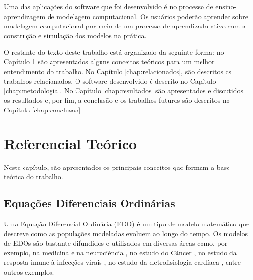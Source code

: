 \documentclass[
	12pt,				%
	openright,			%
	oneside,			%
	a4paper,			%
	main=brazil,
	english,			%
	]{ufsj-abntex2}
\begin{document}
Uma das aplicações do software que foi desenvolvido é no processo de ensino-aprendizagem de modelagem computacional. Os usuários poderão aprender sobre modelagem computacional por meio de um processo de aprendizado ativo com a construção e simulação dos modelos na prática. 

O restante do texto deste trabalho está organizado da seguinte forma: no Capítulo \ref{chap:referencial} são apresentados alguns conceitos teóricos para um melhor entendimento do trabalho. No Capítulo \ref{chap:relacionados}, são descritos os trabalhos relacionados. O software desenvolvido é descrito no Capítulo \ref{chap:metodologia}. No Capítulo \ref{chap:resultados} são apresentados e discutidos os resultados e, por fim, a conclusão e os trabalhos futuros são descritos no Capítulo \ref{chap:conclusao}. 


\chapter{Referencial Teórico}
\label{chap:referencial}

Neste capítulo, são apresentados os principais conceitos que formam a base teórica do trabalho. 

\section{Equações Diferenciais Ordinárias}\label{sec:edos}

Uma Equação Diferencial Ordinária (EDO) é um tipo de modelo matemático que descreve como as populações modeladas evoluem ao longo do tempo. Os modelos de EDOs são bastante difundidos e utilizados em diversas áreas como, por exemplo, na medicina e na neurociência \cite{ADOMIAN1995107}, no estudo do Câncer \cite{spencer2004ordinary, talkington2018ordinary}, no estudo da resposta imune à infecções virais \cite{reis2021validated}, no estudo da eletrofisiologia cardíaca \cite{VIGMOND20083, bucelli2022mathematical}, entre outros exemplos. 
\end{document}
